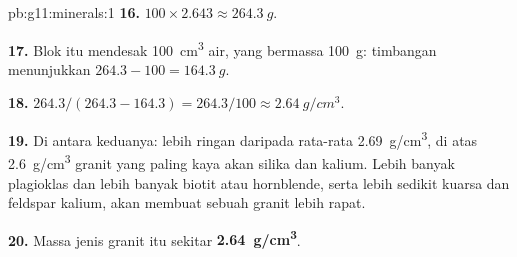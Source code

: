 \begin{solution}{pb:g11:minerals:1}
\textbf{16.} $100 \times 2.643 \approx \qty{264.3}{g}$.

\textbf{17.} Blok itu mendesak \qty{100}{cm^3} air, yang bermassa
\qty{100}{g}: timbangan menunjukkan $264.3 - 100 = \qty{164.3}{g}$.

\textbf{18.} $264.3/(264.3 - 164.3) = 264.3/100 \approx \qty{2.64}{g/cm^3}$.

\textbf{19.} Di antara keduanya: lebih ringan daripada rata-rata
\qty{2.69}{g/cm^3}, di atas \qty{2.6}{g/cm^3} granit yang paling kaya akan silika
dan kalium. Lebih banyak plagioklas dan lebih banyak biotit atau hornblende, serta
lebih sedikit kuarsa dan feldspar kalium, akan membuat sebuah granit lebih rapat.

\textbf{20.} Massa jenis granit itu sekitar
\textbf{\qty{2.64}{g/cm^3}}.
\end{solution}
